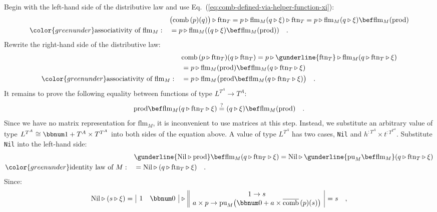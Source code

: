 Begin with the left-hand side of the distributive law and use Eq.~(\ref{eq:comb-defined-via-helper-function-xi}):
\begin{align*}
 & \big(\text{comb}\,(p)(q)\big)\triangleright\text{ftn}_{T}=p\triangleright\text{flm}_{M}(q\triangleright\xi)\triangleright\text{ftn}_{T}=p\triangleright\text{flm}_{M}(q\triangleright\xi)\bef\text{flm}_{M}(\text{prod})\\
{\color{greenunder}\text{associativity of }\text{flm}_{M}:}\quad & =p\triangleright\text{flm}_{M}((q\triangleright\xi)\bef\text{flm}_{M}(\text{prod}))\quad.
\end{align*}
Rewrite the right-hand side of the distributive law:
\begin{align*}
 & \text{comb}\,(p\triangleright\text{ftn}_{T})(q\triangleright\text{ftn}_{T})=p\triangleright\gunderline{\text{ftn}_{T}}\triangleright\text{flm}_{M}(q\triangleright\text{ftn}_{T}\triangleright\xi)\\
 & =p\triangleright\text{flm}_{M}(\text{prod})\bef\text{flm}_{M}(q\triangleright\text{ftn}_{T}\triangleright\xi)\\
{\color{greenunder}\text{associativity of }\text{flm}_{M}:}\quad & =p\triangleright\text{flm}_{M}\big(\text{prod}\bef\text{flm}_{M}(q\triangleright\text{ftn}_{T}\triangleright\xi)\big)\quad.
\end{align*}
It remains to prove the following equality between functions of type
$L^{T^{A}}\rightarrow T^{A}$:
\[
\text{prod}\bef\text{flm}_{M}(q\triangleright\text{ftn}_{T}\triangleright\xi)\overset{?}{=}(q\triangleright\xi)\bef\text{flm}_{M}(\text{prod})\quad.
\]
Since we have no matrix representation for $\text{flm}_{M}$, it is
inconvenient to use matrices at this step. Instead, we substitute
an arbitrary value of type $L^{T^{A}}\cong\bbnum 1+T^{A}\times T^{T^{A}}$
into both sides of the equation above. A value of type $L^{T^{A}}$
has two cases, \lstinline!Nil! and $h^{:T^{A}}\times t^{:T^{T^{A}}}$.
Substitute \lstinline!Nil! into the left-hand side:
\begin{align*}
 & \gunderline{\text{Nil}\triangleright\text{prod}}\bef\text{flm}_{M}(q\triangleright\text{ftn}_{T}\triangleright\xi)=\text{Nil}\triangleright\gunderline{\text{pu}_{M}\bef\text{flm}_{M}}(q\triangleright\text{ftn}_{T}\triangleright\xi)\\
{\color{greenunder}\text{identity law of }M:}\quad & =\text{Nil}\triangleright(q\triangleright\text{ftn}_{T}\triangleright\xi)\quad.
\end{align*}
Since:
\[
\text{Nil}\triangleright(s\triangleright\xi)=\,\begin{array}{|cc|}
1 & \bbnum 0\end{array}\,\triangleright\,\begin{array}{||c|}
1\rightarrow s\\
a\times p\rightarrow\text{pu}_{M}\big(\bbnum 0+a\times\overline{\text{comb}}\,(p)(s)\big)
\end{array}\,=s\quad,
\]
